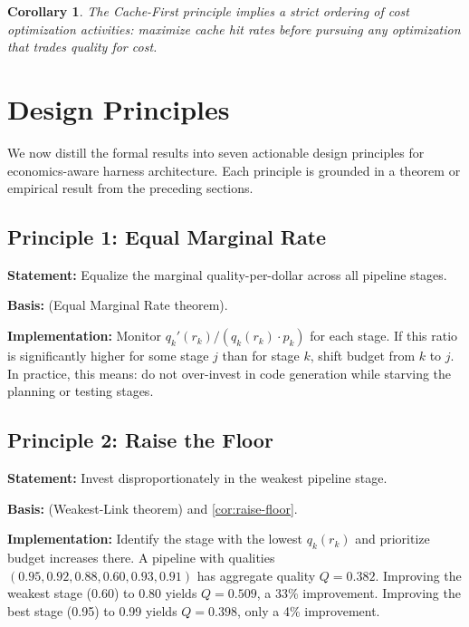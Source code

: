 \documentclass[11pt, a4paper, copyright]{googledeepmind}
\newtheorem{corollary}{Corollary}[section]
\begin{document}
\begin{corollary}\label{cor:cache-first}
The Cache-First principle implies a strict ordering of cost optimization activities: maximize cache hit rates before pursuing any optimization that trades quality for cost.
\end{corollary}


\section{Design Principles}\label{sec:principles}

We now distill the formal results into seven actionable design principles for economics-aware harness architecture. Each principle is grounded in a theorem or empirical result from the preceding sections.

\subsection{Principle 1: Equal Marginal Rate}

\textbf{Statement:} Equalize the marginal quality-per-dollar across all pipeline stages.

\textbf{Basis:}  (Equal Marginal Rate theorem).

\textbf{Implementation:} Monitor $q_k'(r_k) / (q_k(r_k) \cdot p_k)$ for each stage. If this ratio is significantly higher for some stage $j$ than for stage $k$, shift budget from $k$ to $j$. In practice, this means: do not over-invest in code generation while starving the planning or testing stages.

\subsection{Principle 2: Raise the Floor}

\textbf{Statement:} Invest disproportionately in the weakest pipeline stage.

\textbf{Basis:}  (Weakest-Link theorem) and \cref{cor:raise-floor}.

\textbf{Implementation:} Identify the stage with the lowest $q_k(r_k)$ and prioritize budget increases there. A pipeline with qualities $(0.95, 0.92, 0.88, 0.60, 0.93, 0.91)$ has aggregate quality $Q = 0.382$. Improving the weakest stage (0.60) to 0.80 yields $Q = 0.509$, a 33\% improvement. Improving the best stage (0.95) to 0.99 yields $Q = 0.398$, only a 4\% improvement.
\end{document}
